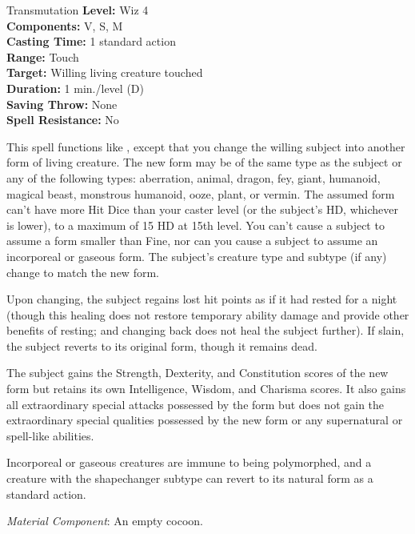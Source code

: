 {Transmutation}
{
	\textbf{Level:}
	Wiz 4\\
	\textbf{Components:}
	V, S, M\\
	\textbf{Casting Time:}
	1 standard action\\
	\textbf{Range:}
	Touch\\
	\textbf{Target:}
	Willing living creature touched\\
	\textbf{Duration:}
	1 min./level (D)\\
	\textbf{Saving Throw:}
	None\\
	\textbf{Spell Resistance:}
	No\\
}
{
	This spell functions like , except that you change the willing subject into another form of living creature. The new form may be of the same type as the subject or any of the following types: aberration, animal, dragon, fey, giant, humanoid, magical beast, monstrous humanoid, ooze, plant, or vermin. The assumed form can't have more Hit Dice than your caster level (or the subject's HD, whichever is lower), to a maximum of 15 HD at 15th level. You can't cause a subject to assume a form smaller than Fine, nor can you cause a subject to assume an incorporeal or gaseous form. The subject's creature type and subtype (if any) change to match the new form.

	Upon changing, the subject regains lost hit points as if it had rested for a night (though this healing does not restore temporary ability damage and provide other benefits of resting; and changing back does not heal the subject further). If slain, the subject reverts to its original form, though it remains dead.

	The subject gains the Strength, Dexterity, and Constitution scores of the new form but retains its own Intelligence, Wisdom, and Charisma scores. It also gains all extraordinary special attacks possessed by the form but does not gain the extraordinary special qualities possessed by the new form or any supernatural or spell-like abilities.

	Incorporeal or gaseous creatures are immune to being polymorphed, and a creature with the shapechanger subtype can revert to its natural form as a standard action.

	\textit{Material Component}:
	An empty cocoon.

}
